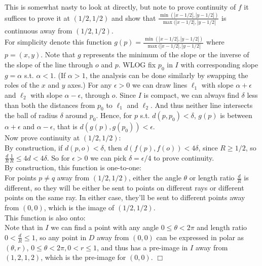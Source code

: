 \documentclass{article}
\begin{document}
This is somewhat nasty to look at directly, but note to prove continuity of $f$ it suffices to prove it at $(1/2,1/2)$ and show that $\frac{\min(|x-1/2|,|y-1/2|)}{\max(|x-1/2|,|y-1/2|}$ is continuous away from $(1/2,1/2)$.\\
For simplicity denote this function $g(p) = \frac{\min(|x-1/2|,|y-1/2|)}{\max(|x-1/2|,|y-1/2|}$ where $p = (x,y)$. Note that $g$ represents the minimum of the slope or the inverse of the slope of the line through $o$ and $p$. WLOG fix $p_0$ in $I$ with corresponding slope $g = \alpha$ s.t. $\alpha < 1$. (If $\alpha > 1$, the analysis can be done similarly by swapping the roles of the $x$ and $y$ axes.) For any $\epsilon > 0$ we can draw lines $\ell_1$ with slope $\alpha + \epsilon$ and $\ell_2$ with slope $\alpha - \epsilon$, through $o$. Since $I$ is compact, we can always find $\delta $ less than both the distances from $p_0$ to $\ell_1$ and $\ell_2$. And thus neither line intersects the ball of radius $\delta$ around $p_0$. Hence, for $p$ s.t. $d(p,p_0) < \delta$, $g(p)$ is between $\alpha + \epsilon$ and $\alpha - \epsilon$, that is $d(g(p),g(p_0)) < \epsilon$.\\
Now prove continuity at $(1/2,1/2)$:\\
By construction, if $d(p,o) < \delta$, then $d(f(p),f(o)) < 4\delta$, since $R \geq 1/2$, so $\frac{d}{R}\frac{1}{R} \leq 4d < 4\delta$. So for $\epsilon > 0$ we can pick $\delta = \epsilon / 4$ to prove continuity.\\
By construction, this function is one-to-one:\\
For points $p\neq q$ away from $(1/2,1/2)$, either the angle $\theta$ or length ratio $\frac{d}{R}$ is different, so they will be either be sent to points on different rays or different points on the same ray. In either case, they'll be sent to different points away from $(0,0)$, which is the image of $(1/2,1/2)$.\\
This function is also onto:\\
Note that in $I$ we can find a point with any angle $0\leq\theta<2\pi$ and length ratio $0<\frac{d}{R}\leq 1$, so any point in $D$ away from $(0,0)$ can be expressed in polar as $(\theta,r)$, $0\leq\theta<2\pi, 0<r\leq1$, and thus has a pre-image in $I$ away from $(1,2,1,2)$, which is the pre-image for $(0,0)$. $\Box$

\section{}
\end{document}
